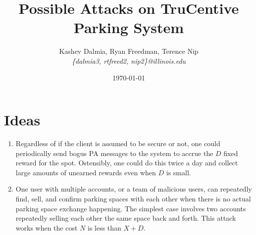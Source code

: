 \documentclass[a4paper]{article}
\title{Possible Attacks on TruCentive Parking System}
\author{Kashev Dalmia, Ryan Freedman, Terence Nip \\
        \textit{\{dalmia3, rtfreed2, nip2\}@illinois.edu}
       }
\date{\today}
\begin{document}
\maketitle

\section{Ideas}
\label{sec:ideas}

\begin{enumerate}
    \item Regardless of if the client is assumed to be secure or not, one could periodically send bogus PA messages to the system to accrue the $D$ fixed reward for the spot. Ostensibly, one could do this twice a day and collect large amounts of unearned rewards even when $D$ is small.
    \item One user with multiple accounts, or a team of malicious users, can repeatedly find, sell, and confirm parking spaces with each other when there is no actual parking space exchange happening. The simplest case involves two accounts repeatedly selling each other the same space back and forth. This attack works when the cost $N$ is less than $X + D$.
\end{enumerate}
\end{document}
